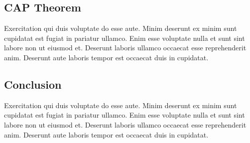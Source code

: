 \subsection{CAP Theorem} \label{subsec:capTheoremNeo4j}

Exercitation qui duis voluptate do esse aute. Minim deserunt ex minim sunt cupidatat est fugiat in pariatur ullamco. Enim esse voluptate nulla et sunt sint labore non ut eiusmod et. Deserunt laboris ullamco occaecat esse reprehenderit anim. Deserunt aute laboris tempor est occaecat duis in cupidatat.

\subsection{Conclusion} \label{subsec:conclusionNeo4j}

Exercitation qui duis voluptate do esse aute. Minim deserunt ex minim sunt cupidatat est fugiat in pariatur ullamco. Enim esse voluptate nulla et sunt sint labore non ut eiusmod et. Deserunt laboris ullamco occaecat esse reprehenderit anim. Deserunt aute laboris tempor est occaecat duis in cupidatat.
